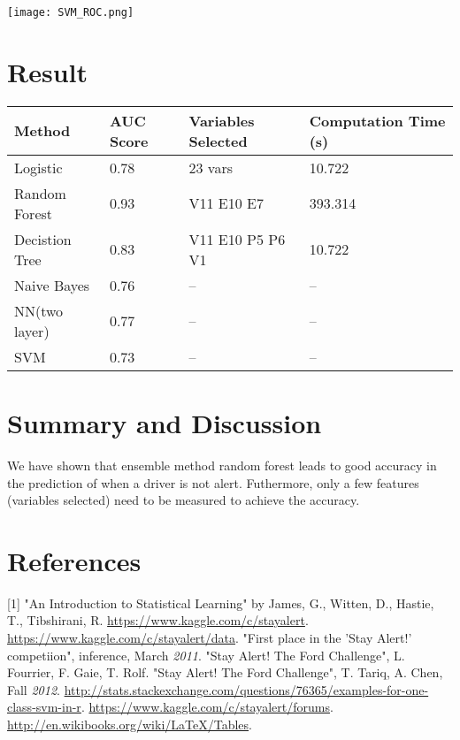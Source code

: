\documentclass[11pt]{article}
\begin{document}
\texttt{[image: SVM\_ROC.png]} 

\section{Result}
\begin{table}[ht]
\begin{center}
\begin{tabular}{|l|l|l|l|}
\hline
\textbf{Method} & \textbf{AUC Score} & \textbf{Variables Selected}  & \textbf{Computation Time (s)} \\ \hline
Logistic &  0.78 & 23 vars  & 10.722 \\  \hline
\rowcolor{yellow}
Random Forest &0.93 & V11 E10 E7 & 393.314 \\ \hline
Decistion Tree & 0.83 & V11 E10 P5 P6 V1 &  10.722 \\ \hline
Naive Bayes & 0.76 & -- & --\\ \hline
NN(two layer) & 0.77 & -- & -- \\ \hline
SVM & 0.73 & -- & --\\ 
\hline
\end{tabular}
\end{center}
\end{table}

\section{Summary and Discussion}
We have shown that ensemble method random forest leads to good accuracy in the prediction of when a driver is not alert. Futhermore, only a few features (variables selected) need to be measured to achieve the accuracy.

\section {References}
[1]  "An Introduction to Statistical Learning" by James, G., Witten, D., Hastie, T., Tibshirani, R. \newline
[2] \url{https://www.kaggle.com/c/stayalert}. \newline
[3] \url{https://www.kaggle.com/c/stayalert/data}. \newline
[4] "First place in the 'Stay Alert!' competiion", inference, March \textit{2011}. \newline
[5] "Stay Alert! The Ford Challenge", L. Fourrier, F. Gaie, T. Rolf. \newline
[6] "Stay Alert! The Ford Challenge", T. Tariq, A. Chen, Fall \textit{2012}. \newline
[7] \url{http://stats.stackexchange.com/questions/76365/examples-for-one-class-svm-in-r}. \newline
[8] \url{https://www.kaggle.com/c/stayalert/forums}. \newline
[9] \url{http://en.wikibooks.org/wiki/LaTeX/Tables}. \newline

\end{document}
